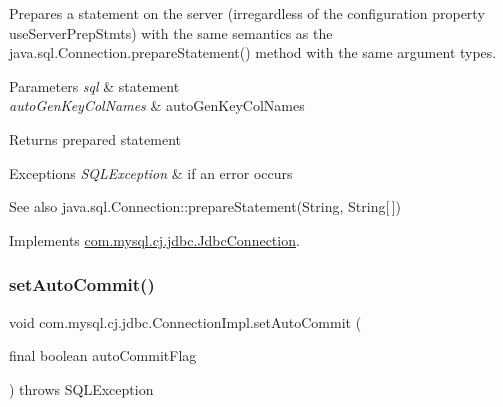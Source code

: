 Prepares a statement on the server (irregardless of the configuration property \textquotesingle{}use\+Server\+Prep\+Stmts\textquotesingle{}) with the same semantics as the java.\+sql.\+Connection.\+prepare\+Statement() method with the same argument types.


\begin{DoxyParams}{Parameters}
{\em sql} & statement \\
\hline
{\em auto\+Gen\+Key\+Col\+Names} & auto\+Gen\+Key\+Col\+Names \\
\hline
\end{DoxyParams}
\begin{DoxyReturn}{Returns}
prepared statement 
\end{DoxyReturn}

\begin{DoxyExceptions}{Exceptions}
{\em S\+Q\+L\+Exception} & if an error occurs\\
\hline
\end{DoxyExceptions}
\begin{DoxySeeAlso}{See also}
java.\+sql.\+Connection\+::prepare\+Statement(\+String, String\mbox{[}$\,$\mbox{]}) 
\end{DoxySeeAlso}


Implements \mbox{\hyperlink{interfacecom_1_1mysql_1_1cj_1_1jdbc_1_1_jdbc_connection_aa15ffc32d47d1950257c4720802694bf}{com.\+mysql.\+cj.\+jdbc.\+Jdbc\+Connection}}.

\mbox{\label{classcom_1_1mysql_1_1cj_1_1jdbc_1_1_connection_impl_a53c90790a0e3d5c1ebae0278a15453be}} 
\subsubsection{\texorpdfstring{set\+Auto\+Commit()}{setAutoCommit()}}
{\footnotesize\ttfamily void com.\+mysql.\+cj.\+jdbc.\+Connection\+Impl.\+set\+Auto\+Commit (\begin{DoxyParamCaption}\item[{final boolean}]{auto\+Commit\+Flag }\end{DoxyParamCaption}) throws S\+Q\+L\+Exception}

